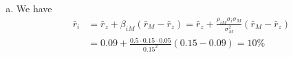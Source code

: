 \documentclass{article}
\begin{document}
\begin{enumerate}
\begin{enumerate}[(a)]
			\item 
				\begin{soln}
					We have
					\begin{align*}
						\bar r_i &= \bar r_z + \beta_{iM}(\bar r_M-\bar r_z) = \bar r_z+ \frac{\rho_{iM}\sigma_i\sigma_M}{\sigma_M^2}(\bar r_M-\bar r_z) \\
						&= 0.09 + \frac{0.5\cdot 0.15\cdot 0.05}{0.15^2}(0.15-0.09) = 10\%
					\end{align*}
				\end{soln}

		\end{enumerate}
		
\end{enumerate}
\end{document}
